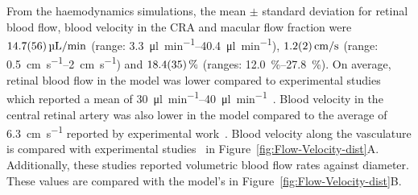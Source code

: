 \documentclass[11pt,]{article}
\begin{document}
From the haemodynamics simulations, the mean $\pm$ standard deviation for retinal blood flow, blood velocity in the CRA and macular flow fraction were $\SI[per-mode=symbol]{14.7 \pm 5.6}{\micro\litre\per\minute}$ (range: \SIrange[per-mode=symbol]{3.3}{40.4}{\micro\litre\per\minute}), $\SI[per-mode=symbol]{1.2 \pm 0.2}{\cm\per\second}$ (range: \SIrange[per-mode=symbol]{0.5}{2}{\cm\per\second}) and $\SI{18.4 \pm 3.5}{\percent}$ (ranges: \SIrange{12.0}{27.8}{\percent}).
On average, retinal blood flow in the model was lower compared to experimental studies which reported a mean of \SIrange{30}{40}{\micro\litre\per\minute}~\cite{DoblhoffDier2014,Riva1985}.
Blood velocity in the central retinal artery was also lower in the model compared to the average of \SI{6.3}{\cm\per\second} reported by experimental work~\cite{Dorner2009}.
Blood velocity along the vasculature is compared with experimental studies~\cite{DoblhoffDier2014,Riva1985} in Figure~\ref{fig:Flow-Velocity-dist}A.
Additionally, these studies reported volumetric blood flow rates against diameter. These values are compared with the model's in Figure~\ref{fig:Flow-Velocity-dist}B. 
\end{document}
